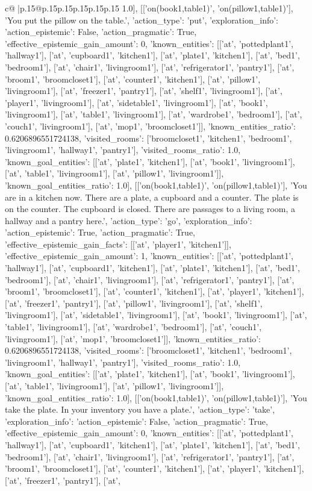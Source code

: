 \documentclass{article}
\begin{document}
{\begin{supertabular}{c@{$\;$}|p{.15\linewidth}@{}p{.15\linewidth}p{.15\linewidth}p{.15\linewidth}p{.15\linewidth}p{.15\linewidth}}
{{{1.0}}], [['on(book1,table1)', 'on(pillow1,table1)'], 'You put the pillow on the table.', {'action_type': 'put', 'exploration_info': {'action_epistemic': False, 'action_pragmatic': True, 'effective_epistemic_gain_amount': 0, 'known_entities': [['at', 'pottedplant1', 'hallway1'], ['at', 'cupboard1', 'kitchen1'], ['at', 'plate1', 'kitchen1'], ['at', 'bed1', 'bedroom1'], ['at', 'chair1', 'livingroom1'], ['at', 'refrigerator1', 'pantry1'], ['at', 'broom1', 'broomcloset1'], ['at', 'counter1', 'kitchen1'], ['at', 'pillow1', 'livingroom1'], ['at', 'freezer1', 'pantry1'], ['at', 'shelf1', 'livingroom1'], ['at', 'player1', 'livingroom1'], ['at', 'sidetable1', 'livingroom1'], ['at', 'book1', 'livingroom1'], ['at', 'table1', 'livingroom1'], ['at', 'wardrobe1', 'bedroom1'], ['at', 'couch1', 'livingroom1'], ['at', 'mop1', 'broomcloset1']], 'known_entities_ratio': 0.6206896551724138, 'visited_rooms': ['broomcloset1', 'kitchen1', 'bedroom1', 'livingroom1', 'hallway1', 'pantry1'], 'visited_rooms_ratio': 1.0, 'known_goal_entities': [['at', 'plate1', 'kitchen1'], ['at', 'book1', 'livingroom1'], ['at', 'table1', 'livingroom1'], ['at', 'pillow1', 'livingroom1']], 'known_goal_entities_ratio': 1.0}}], [['on(book1,table1)', 'on(pillow1,table1)'], 'You are in a kitchen now. There are a plate, a cupboard and a counter. The plate is on the counter. The cupboard is closed. There are passages to a living room, a hallway and a pantry here.', {'action_type': 'go', 'exploration_info': {'action_epistemic': True, 'action_pragmatic': True, 'effective_epistemic_gain_facts': [['at', 'player1', 'kitchen1']], 'effective_epistemic_gain_amount': 1, 'known_entities': [['at', 'pottedplant1', 'hallway1'], ['at', 'cupboard1', 'kitchen1'], ['at', 'plate1', 'kitchen1'], ['at', 'bed1', 'bedroom1'], ['at', 'chair1', 'livingroom1'], ['at', 'refrigerator1', 'pantry1'], ['at', 'broom1', 'broomcloset1'], ['at', 'counter1', 'kitchen1'], ['at', 'player1', 'kitchen1'], ['at', 'freezer1', 'pantry1'], ['at', 'pillow1', 'livingroom1'], ['at', 'shelf1', 'livingroom1'], ['at', 'sidetable1', 'livingroom1'], ['at', 'book1', 'livingroom1'], ['at', 'table1', 'livingroom1'], ['at', 'wardrobe1', 'bedroom1'], ['at', 'couch1', 'livingroom1'], ['at', 'mop1', 'broomcloset1']], 'known_entities_ratio': 0.6206896551724138, 'visited_rooms': ['broomcloset1', 'kitchen1', 'bedroom1', 'livingroom1', 'hallway1', 'pantry1'], 'visited_rooms_ratio': 1.0, 'known_goal_entities': [['at', 'plate1', 'kitchen1'], ['at', 'book1', 'livingroom1'], ['at', 'table1', 'livingroom1'], ['at', 'pillow1', 'livingroom1']], 'known_goal_entities_ratio': 1.0}}], [['on(book1,table1)', 'on(pillow1,table1)'], 'You take the plate. In your inventory you have a plate.', {'action_type': 'take', 'exploration_info': {'action_epistemic': False, 'action_pragmatic': True, 'effective_epistemic_gain_amount': 0, 'known_entities': [['at', 'pottedplant1', 'hallway1'], ['at', 'cupboard1', 'kitchen1'], ['at', 'plate1', 'kitchen1'], ['at', 'bed1', 'bedroom1'], ['at', 'chair1', 'livingroom1'], ['at', 'refrigerator1', 'pantry1'], ['at', 'broom1', 'broomcloset1'], ['at', 'counter1', 'kitchen1'], ['at', 'player1', 'kitchen1'], ['at', 'freezer1', 'pantry1'], ['at', }}}
\end{supertabular}}
\end{document}
